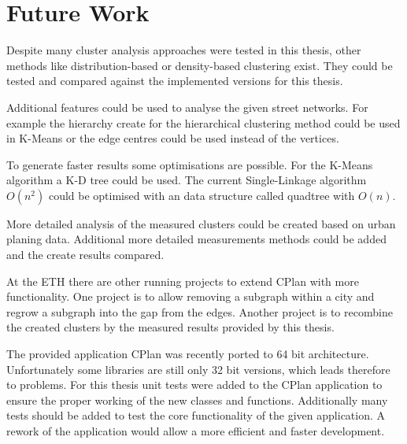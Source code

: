 \chapter{Future Work}
\label{sec:future_work}

Despite many cluster analysis approaches were tested in this thesis, other methods like distribution-based or density-based clustering exist. They could be tested and compared against the implemented versions for this thesis.

Additional features could be used to analyse the given street networks. For example the hierarchy create for the hierarchical clustering method could be used in K-Means or the edge centres could be used instead of the vertices.

To generate faster results some optimisations are possible. For the K-Means algorithm a K-D tree could be used. The current Single-Linkage algorithm $O(n^2)$ could be optimised with an data structure called quadtree with $O(n)$.

More detailed analysis of the measured clusters could be created based on urban planing data. Additional more detailed measurements methods could be added and the create results compared.

At the ETH there are other running projects to extend CPlan with more functionality. One project is to allow removing a subgraph within a city and regrow a subgraph into the gap from the edges. Another project is to recombine the created clusters by the measured results provided by this thesis.

The provided application CPlan was recently ported to 64 bit architecture. Unfortunately some libraries are still only 32 bit versions, which leads therefore to problems. For this thesis unit tests were added to the CPlan application to ensure the proper working of the new classes and functions. Additionally many tests should be added to test the core functionality of the given application. A rework of the application would allow a more efficient and faster development.